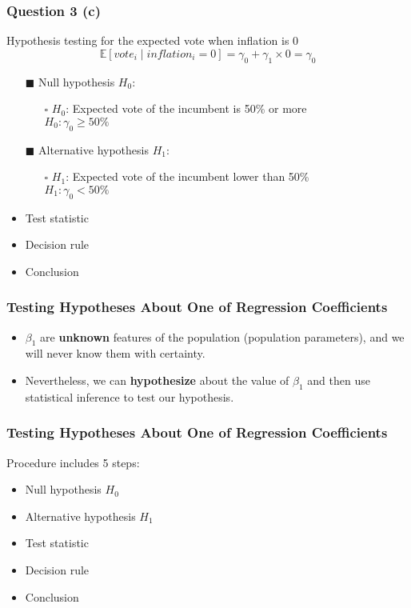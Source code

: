 \documentclass[11pt, xcolor=x11names,compress]{beamer}
\begin{document}
\begin{frame}[fragile,t]
\frametitle{Question 3 (c)}
\linespread{1.15}
Hypothesis testing for the expected vote when inflation is 0
$$
\mathbb{E}\left[vote_i \mid inflation_i =0\right]=\gamma_{0}+\gamma_{1} \times 0=\gamma_{0}
$$
\begin{itemize}
    \item [$\blacksquare$] Null hypothesis $H_0$:
    \begin{itemize}
        \item [$\square$] $H_0$: Expected vote of the incumbent is 50\% or more\\
              $H_0: \gamma_0 \geq 50\%$
    \end{itemize}
    \item [$\blacksquare$] Alternative hypothesis $H_1$:
    \begin{itemize}
        \item [$\square$] $H_1$: Expected vote of the incumbent lower than 50\%\\
              $H_1: \gamma_0 < 50\%$
    \end{itemize}    
    \item Test statistic
    \item Decision rule
    \item Conclusion
\end{itemize}
\end{frame}

\begin{frame}[fragile,t]
\frametitle{Testing Hypotheses About One
of Regression Coefficients}\label{Hypothesis}
\linespread{1.3}
\begin{itemize}
    \item $\beta_1$ are \textbf{unknown} features of the population (population parameters), and we will never know them with certainty.
    \item Nevertheless, we can \textbf{hypothesize} about the value of $\beta_1$ and then use statistical inference to test our hypothesis.
\end{itemize}
 \end{frame}

\begin{frame}[fragile,t]
\linespread{1.3}
\frametitle{Testing Hypotheses About One
of Regression Coefficients}

Procedure includes 5 steps:
\begin{itemize}
    \item Null hypothesis $H_0$
    \item Alternative hypothesis $H_1$
    \item Test statistic
    \item Decision rule
    \item Conclusion
\end{itemize}

\end{frame}
\end{document}
